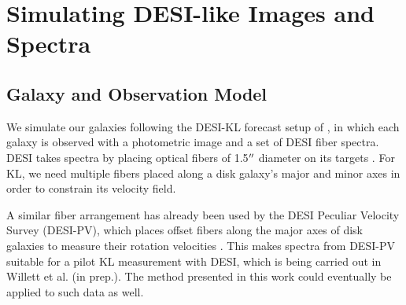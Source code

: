 \section{Simulating DESI-like Images and Spectra}
\label{sec:data-generate}

\subsection{Galaxy and Observation Model}
\label{ssec:kl-model}

We simulate our galaxies following the DESI-KL forecast setup of \citep{KLDESI}, in which each galaxy is observed with a photometric image and a set of DESI fiber spectra. DESI takes spectra by placing optical fibers of 1.5${^{\prime\prime}}$ diameter on its targets \citep{DESIOverview}. For KL, we need multiple fibers placed along a disk galaxy's major and minor axes in order to constrain its velocity field.

A similar fiber arrangement has already been used by the DESI Peculiar Velocity Survey (DESI-PV), which places offset fibers along the major axes of disk galaxies to measure their rotation velocities \citep{DESIPVTargetSel2023, DESIPVTF2025}. This makes spectra from DESI-PV suitable for a pilot KL measurement with DESI, which is being carried out in Willett et al. (in prep.). The method presented in this work could eventually be applied to such data as well.

